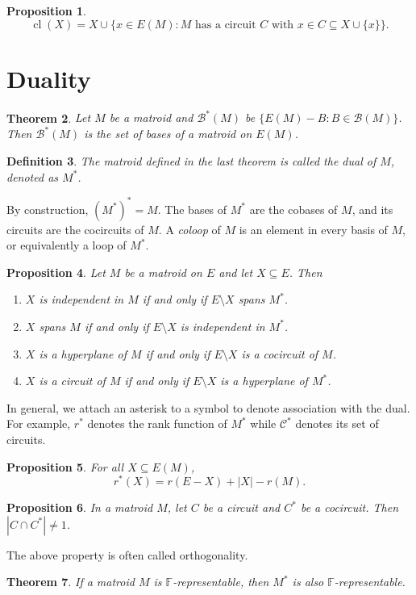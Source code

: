 \documentclass[11pt,letterpaper]{article}
\newcommand{\F}{\mathbb{F}}
\newcommand{\B}{\mathcal{B}}
\newcommand{\C}{\mathcal{C}}
\DeclareMathOperator{\cl}{cl}
\theoremstyle{appendix-result}
\newtheorem{theorem}{Theorem}[section]
\newtheorem{proposition}[theorem]{Proposition}
\theoremstyle{appendix-definition}
\newtheorem{definition}[theorem]{Definition}
\begin{document}
\begin{proposition}
    \[\cl(X) = X \cup \{x\in E(M): \text{$M$ has a circuit $C$ with $x \in C \subseteq X \cup \{x\}$}\}.\]
\end{proposition}
\section{Duality}
\begin{theorem}
    Let $M$ be a matroid and $\B^*(M)$ be $\{E(M)-B:B \in \B(M)\}$. Then $\B^*(M)$ is the set of bases of a matroid on $E(M)$.
\end{theorem}
\begin{definition}
    The matroid defined in the last theorem is called the dual of $M$, denoted as $M^*$.
\end{definition}
By construction, $(M^*)^*=M$. The bases of $M^*$ are the cobases of $M$, and its circuits are the cocircuits of $M$. A \emph{coloop} of $M$ is an element in every basis of $M$, or equivalently a loop of $M^*$.
\begin{proposition}
    Let $M$ be a matroid on $E$ and let $X \subseteq E$. Then
    \begin{enumerate}
        \item $X$ is independent in $M$ if and only if $E\setminus X$ spans $M^*$.
        \item $X$ spans $M$ if and only if $E\setminus X$ is independent in $M^*$.
        \item $X$ is a hyperplane of $M$ if and only if $E\setminus X$ is a cocircuit of $M$.
        \item $X$ is a circuit of $M$ if and only if $E\setminus X$ is a hyperplane of $M^*$.
    \end{enumerate}
\end{proposition}
In general, we attach an asterisk to a symbol to denote association with the dual. For example, $r^*$ denotes the rank function of $M^*$ while $\C^*$ denotes its set of circuits.
\begin{proposition}
    For all $X \subseteq E(M)$,
    \[r^*(X) = r(E-X)+|X|-r(M).\]
\end{proposition}
\begin{proposition}
    In a matroid $M$, let $C$ be a circuit and $C^*$ be a cocircuit. Then $|C \cap C^*| \ne 1$.
\end{proposition}
The above property is often called orthogonality.
\begin{theorem}
    If a matroid $M$ is $\F$-representable, then $M^*$ is also $\F$-representable.
\end{theorem}
\end{document}

